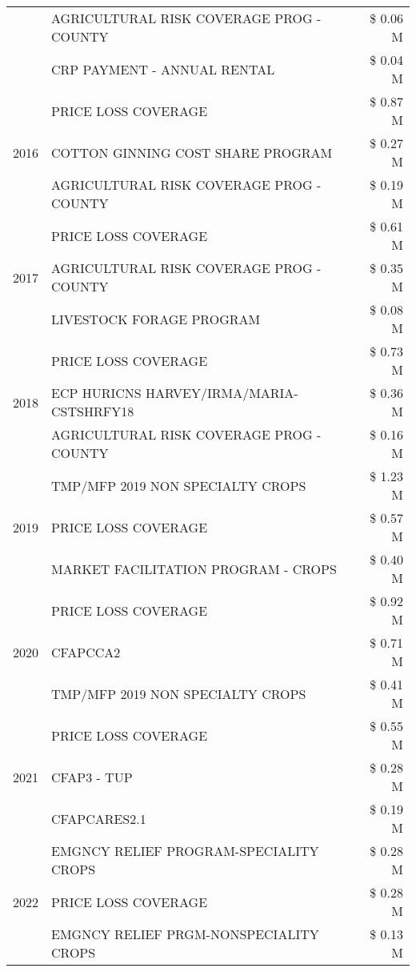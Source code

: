 \begin{tabular}{llr}
 & AGRICULTURAL RISK COVERAGE PROG - COUNTY & \$ 0.06 M \\
 & CRP PAYMENT - ANNUAL RENTAL & \$ 0.04 M \\
\cline{1-3}
\multirow[t]{3}{*}{2016} & PRICE LOSS COVERAGE & \$ 0.87 M \\
 & COTTON GINNING COST SHARE PROGRAM & \$ 0.27 M \\
 & AGRICULTURAL RISK COVERAGE PROG - COUNTY & \$ 0.19 M \\
\cline{1-3}
\multirow[t]{3}{*}{2017} & PRICE LOSS COVERAGE & \$ 0.61 M \\
 & AGRICULTURAL RISK COVERAGE PROG - COUNTY & \$ 0.35 M \\
 & LIVESTOCK FORAGE PROGRAM & \$ 0.08 M \\
\cline{1-3}
\multirow[t]{3}{*}{2018} & PRICE LOSS COVERAGE & \$ 0.73 M \\
 & ECP HURICNS HARVEY/IRMA/MARIA-CSTSHRFY18 & \$ 0.36 M \\
 & AGRICULTURAL RISK COVERAGE PROG - COUNTY & \$ 0.16 M \\
\cline{1-3}
\multirow[t]{3}{*}{2019} & TMP/MFP 2019 NON SPECIALTY CROPS & \$ 1.23 M \\
 & PRICE LOSS COVERAGE & \$ 0.57 M \\
 & MARKET FACILITATION PROGRAM - CROPS & \$ 0.40 M \\
\cline{1-3}
\multirow[t]{3}{*}{2020} & PRICE LOSS COVERAGE & \$ 0.92 M \\
 & CFAPCCA2 & \$ 0.71 M \\
 & TMP/MFP 2019 NON SPECIALTY CROPS & \$ 0.41 M \\
\cline{1-3}
\multirow[t]{3}{*}{2021} & PRICE LOSS COVERAGE & \$ 0.55 M \\
 & CFAP3 - TUP & \$ 0.28 M \\
 & CFAPCARES2.1 & \$ 0.19 M \\
\cline{1-3}
\multirow[t]{3}{*}{2022} & EMGNCY RELIEF PROGRAM-SPECIALITY CROPS & \$ 0.28 M \\
 & PRICE LOSS COVERAGE & \$ 0.28 M \\
 & EMGNCY RELIEF PRGM-NONSPECIALITY CROPS & \$ 0.13 M \\
\cline{1-3}
\bottomrule
\end{tabular}
